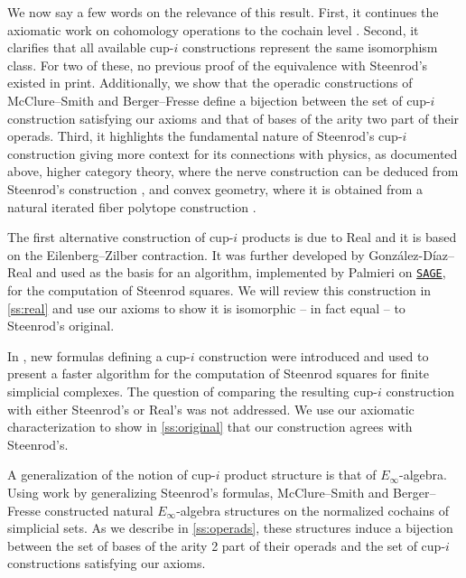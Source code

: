 We now say a few words on the relevance of this result.
First, it continues the axiomatic work on cohomology operations to the cochain level \cite{steenrod1962cohomology}.
Second, it clarifies that all available cup-$i$ constructions represent the same isomorphism class.
For two of these, no previous proof of the equivalence with Steenrod's existed in print.
Additionally, we show that the operadic constructions of McClure--Smith \cite{mcclure2003multivariable} and Berger--Fresse \cite{berger2004combinatorial} define a bijection between the set of cup-$i$ construction satisfying our axioms and that of bases of the arity two part of their operads.
Third, it highlights the fundamental nature of Steenrod's \mbox{cup-$i$} construction giving more context for its connections with physics, as documented above, higher category theory, where the nerve construction can be deduced from Steenrod's construction \cite{street1987orientals, medina2020globular}, and convex geometry, where it is obtained from a natural iterated fiber polytope construction \cite{billera1992fiber_polytope, medina2022fib_poly}.

The first alternative construction of \mbox{cup-$i$} products is due to Real \cite{real1996computability} and it is based on the Eilenberg--Zilber contraction.
It was further developed by Gonz\'alez-D\'iaz--Real \cite{gonzalez-diaz1999steenrod} and used as the basis for an algorithm, implemented by Palmieri on \href{https://www.sagemath.org/}{\texttt{SAGE}}, for the computation of Steenrod squares.
We will review this construction in \cref{ss:real} and use our axioms to show it is isomorphic -- in fact equal -- to Steenrod's original.

In \cite{medina2021fast_sq}, new formulas defining a \mbox{cup-$i$} construction were introduced and used to present a faster algorithm for the computation of Steenrod squares for finite simplicial complexes.
The question of comparing the resulting \mbox{cup-$i$} construction with either Steenrod's or Real's was not addressed.
We use our axiomatic characterization to show in \cref{ss:original} that our construction agrees with Steenrod's.

A generalization of the notion of \mbox{cup-$i$} product structure is that of $E_\infty$-algebra.
Using work by \cite[]{benson1998representations} generalizing Steenrod's formulas, McClure--Smith \cite{mcclure2003multivariable} and Berger--Fresse \cite{berger2004combinatorial} constructed natural $E_\infty$-algebra structures on the normalized cochains of simplicial sets.
As we describe in \cref{ss:operads}, these structures induce a bijection between the set of bases of the arity 2 part of their operads and the set of \mbox{cup-$i$} constructions satisfying our axioms.

